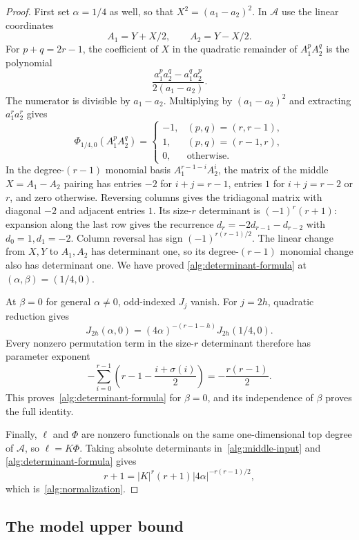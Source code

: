 \begin{proof}
First set $\alpha=1/4$ as well, so that $X^2=(a_1-a_2)^2$.
In $\mathcal A$ use the linear coordinates
\[
 A_1=Y+X/2,\qquad A_2=Y-X/2.
\]
For $p+q=2r-1$, the coefficient of $X$ in the quadratic remainder of
$A_1^pA_2^q$ is the polynomial
\[
 \frac{a_1^pa_2^q-a_1^qa_2^p}{2(a_1-a_2)}.
\]
The numerator is divisible by $a_1-a_2$.  Multiplying by
$(a_1-a_2)^2$ and extracting $a_1^ra_2^r$ gives
\begin{equation}
 \Phi_{1/4,0}(A_1^pA_2^q)=
 \begin{cases}
 -1,&(p,q)=(r,r-1),\\
 1,&(p,q)=(r-1,r),\\
 0,&\text{otherwise}.
 \end{cases}
 \label{alg:base-functional}
\end{equation}
In the degree-$(r-1)$ monomial basis
$A_1^{r-1-i}A_2^i$, the matrix of the middle $X=A_1-A_2$ pairing
has entries $-2$ for $i+j=r-1$, entries $1$ for $i+j=r-2$ or $r$,
and zero otherwise.  Reversing columns gives the tridiagonal matrix
with diagonal $-2$ and adjacent entries $1$.
Its size-$r$ determinant is $(-1)^r(r+1)$: expansion along the last
row gives the recurrence $d_r=-2d_{r-1}-d_{r-2}$ with $d_0=1,d_1=-2$.
Column reversal has sign $(-1)^{r(r-1)/2}$.
The linear change from $X,Y$ to $A_1,A_2$ has determinant one, so its
degree-$(r-1)$ monomial change also has determinant one.  We have proved
\eqref{alg:determinant-formula} at $(\alpha,\beta)=(1/4,0)$.

At $\beta=0$ for general $\alpha\ne0$, odd-indexed $J_j$ vanish.
For $j=2h$, quadratic reduction gives
\[
 J_{2h}(\alpha,0)
   =(4\alpha)^{-(r-1-h)}J_{2h}(1/4,0).
\]
Every nonzero permutation term in the size-$r$ determinant therefore
has parameter exponent
\[
 -\sum_{i=0}^{r-1}\left(r-1-\frac{i+\sigma(i)}2\right)
   =-\frac{r(r-1)}2.
\]
This proves~\eqref{alg:determinant-formula} for $\beta=0$, and its
independence of $\beta$ proves the full identity.

Finally, $\ell$ and $\Phi$ are nonzero functionals on the same
one-dimensional top degree of $\mathcal A$, so $\ell=K\Phi$.
Taking absolute determinants in~\eqref{alg:middle-input} and
\eqref{alg:determinant-formula} gives
\[
 r+1=|K|^r(r+1)|4\alpha|^{-r(r-1)/2},
\]
which is~\eqref{alg:normalization}.
\end{proof}

\subsection{The model upper bound}

